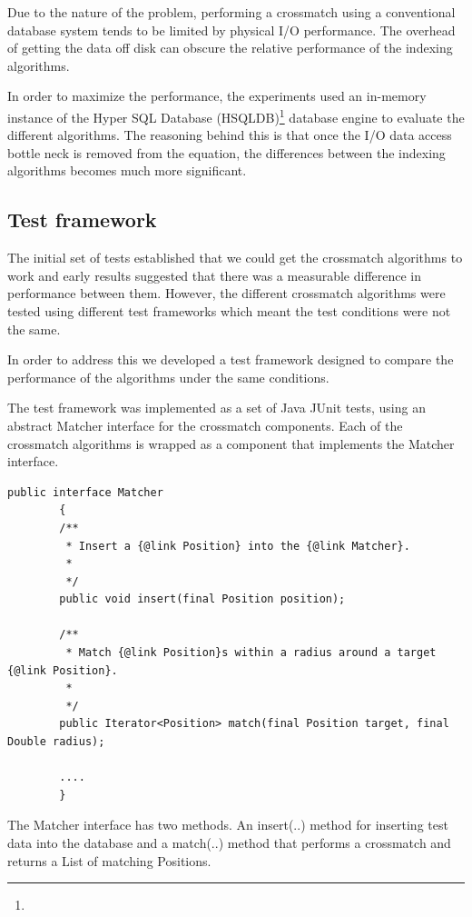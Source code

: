 \documentclass{article}
\newcommand{\junit} {JUnit\xspace}
\newcommand{\hsqldb} {HSQLDB\xspace}
\newcommand{\crossmatch} {crossmatch\xspace}
\newcommand{\hdisk} {disk\xspace}
\newcommand{\footurl}[1] {\footnote{\burl{#1}}}
\newcommand{\javaname}[1] {{\ttfamily\color{codeblue} #1}}
\newcommand{\javaplural}[1] {\javaname{#1}s}
\begin{document}
Due to the nature of the problem, performing a \crossmatch using a conventional database system tends to be limited by physical I/O performance. The overhead of getting the data off \hdisk can obscure the relative performance of the indexing algorithms.

In order to maximize the performance, the experiments used an in-memory instance of the Hyper SQL Database (\hsqldb)\footurl{http://hsqldb.org/} database engine to evaluate the different algorithms. The reasoning behind this is that once the I/O data access bottle neck is removed from the equation, the differences between the indexing algorithms becomes much more significant.

\subsection{Test framework}
\label{test-framework}

The initial set of tests established that we could get the  \crossmatch algorithms to work and early results suggested that there was a measurable difference in performance between them.
However, the different \crossmatch algorithms were tested using different test frameworks which meant the test conditions were not the same.

In order to address this we developed a test framework designed to compare the performance of the algorithms under the same conditions.

The test framework was implemented as a set of Java \junit tests, using an abstract \javaname{Matcher} interface for the \crossmatch components.
Each of the \crossmatch algorithms is wrapped as a component that implements the \javaname{Matcher} interface.

\begin{lstlisting}[style=Java]
    public interface Matcher
        {
        /**
         * Insert a {@link Position} into the {@link Matcher}.
         * 
         */
        public void insert(final Position position);

        /**
         * Match {@link Position}s within a radius around a target {@link Position}.
         * 
         */
        public Iterator<Position> match(final Position target, final Double radius);

        ....
        }
\end{lstlisting}

The \javaname{Matcher} interface has two methods.
An \javaname{insert(..)} method for inserting test data into the database and a \javaname{match(..)} method that performs a \crossmatch and returns a \javaname{List} of matching \javaplural{Position}.
\end{document}
